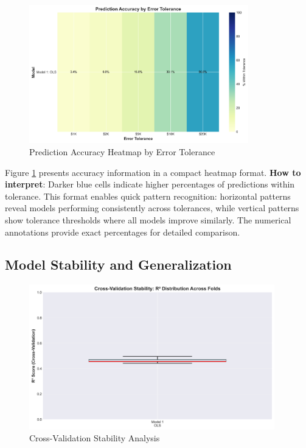 \begin{figure}[h!]
\centering
\includegraphics[width=0.85\textwidth]{figures/plot_e_tolerance_heatmap.png}
\caption{Prediction Accuracy Heatmap by Error Tolerance}
\label{fig:tolerance_heatmap}
\end{figure}

Figure \ref{fig:tolerance_heatmap} presents accuracy information in a compact heatmap format. \textbf{How to interpret}: Darker blue cells indicate higher percentages of predictions within tolerance. This format enables quick pattern recognition: horizontal patterns reveal models performing consistently across tolerances, while vertical patterns show tolerance thresholds where all models improve similarly. The numerical annotations provide exact percentages for detailed comparison.

\subsection{Model Stability and Generalization}

\begin{figure}[h!]
\centering
\includegraphics[width=0.95\textwidth]{figures/plot_f_cv_boxplot.png}
\caption{Cross-Validation Stability Analysis}
\label{fig:cv_stability}
\end{figure}

